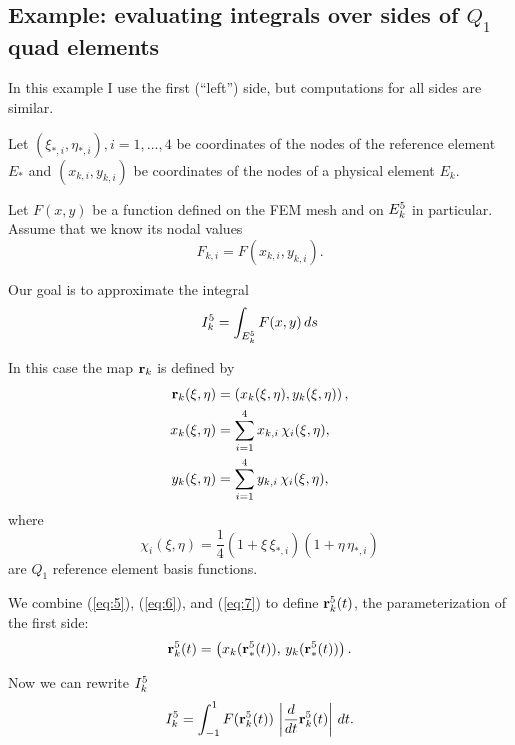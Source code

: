 \documentclass[11pt]{article}
\begin{document}
\subsection{Example: evaluating integrals over sides of $Q_{1}$ quad elements}
\label{sec-3-1}

In this example I use the first (``left'') side, but computations for
all sides are similar.

Let $(\xi_{*,i}, \eta_{*,i}), i = 1,\dots,4$ be coordinates of the nodes
of the reference element $E_{*}$ and $(x_{k,i}, y_{k,i})$ be coordinates
of the nodes of a physical element $E_{k}$.

Let $F(x,y)$ be a function defined on the FEM mesh and on $E_{k}^{5}$ in
particular. Assume that we know its nodal values
\begin{equation}
\label{eq:10}
F_{k,i} = F(x_{k,i}, y_{k,i}).
\end{equation}

Our goal is to approximate the integral
\begin{equation}
\label{eq:11}
I_{k}^{5} = \int_{E_{k}^{5}} F(x,y)\, ds
\end{equation}

In this case the map $\mathbf{r}_{k}$ is defined by 
\begin{equation}
\label{eq:12}
\begin{aligned}
\mathbf{r}_{k}(\xi,\eta) &= \left( x_{k}(\xi,\eta), y_{k}(\xi,\eta) \right),\\
x_{k}(\xi,\eta) &= \sum_{i=1}^{4} x_{k,i}\, \chi_{i}(\xi, \eta),\\
y_{k}(\xi,\eta) &= \sum_{i=1}^{4} y_{k,i}\, \chi_{i}(\xi, \eta),\\
\end{aligned}
\end{equation}
where
\begin{equation}
\label{eq:13}
\chi_{i}(\xi,\eta) = \frac14 (1 + \xi\,\xi_{*,i})(1 + \eta\,\eta_{*,i})
\end{equation}
are $Q_{1}$ reference element basis functions.

We combine (\ref{eq:5}), (\ref{eq:6}), and (\ref{eq:7}) to define $\mathbf{r}_{k}^{5}(t)$, the parameterization of the first side:
\begin{equation}
  \label{eq:14}
  \mathbf{r}_{k}^{5}(t) = \left( x_{k}(\mathbf{r}_{*}^{5}(t)),\, y_{k}(\mathbf{r}_{*}^{5}(t)) \right).
\end{equation}

Now we can rewrite $I_{k}^{5}$
\begin{equation}
\label{eq:15}
I_{k}^{5} = \int_{-1}^{1} F(\mathbf{r}_{k}^{5}(t))\, \left|\frac{d}{dt}\mathbf{r}_{k}^{5}(t) \right|\, dt.
\end{equation}
\end{document}
